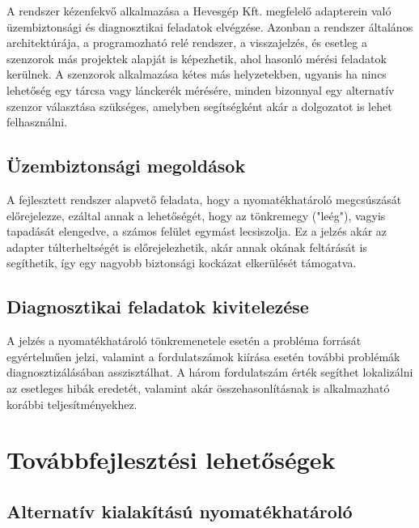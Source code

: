A rendszer kézenfekvő alkalmazása a Hevesgép Kft. megfelelő adapterein való üzembiztonsági és diagnosztikai feladatok elvégzése. Azonban a rendszer általános architektúrája, a programozható relé rendszer, a visszajelzés, és esetleg a szenzorok más projektek alapját is képezhetik, ahol hasonló mérési feladatok kerülnek. A szenzorok alkalmazása kétes más helyzetekben, ugyanis ha nincs lehetőség egy tárcsa vagy lánckerék mérésére, minden bizonnyal egy alternatív szenzor választása szükséges, amelyben segítségként akár a dolgozatot is lehet felhasználni.
\subsection{Üzembiztonsági megoldások}

A fejlesztett rendszer alapvető feladata, hogy a nyomatékhatároló megcsúszását előrejelezze, ezáltal annak a lehetőségét, hogy az tönkremegy ("leég"), vagyis tapadását elengedve, a számos felület egymást lecsiszolja. Ez a jelzés akár az adapter túlterheltségét is előrejelezhetik, akár annak okának feltárását is segíthetik, így egy nagyobb biztonsági kockázat elkerülését támogatva.

\subsection{Diagnosztikai feladatok kivitelezése}

A jelzés a nyomatékhatároló tönkremenetele esetén a probléma forrását egyértelműen jelzi, valamint a fordulatszámok kiírása esetén további problémák diagnosztizálásában asszisztálhat. A három fordulatszám érték segíthet lokalizálni az esetleges hibák eredetét, valamint akár összehasonlításnak is alkalmazható korábbi teljesítményekhez.

\section{Továbbfejlesztési lehetőségek}

\subsection{Alternatív kialakítású nyomatékhatároló}

